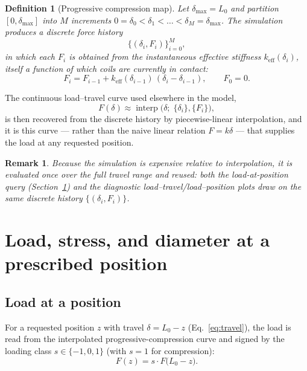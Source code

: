 \documentclass[11pt]{article}
\newtheorem{definition}{Definition}
\newtheorem{remark}{Remark}
\begin{document}
\begin{definition}[Progressive compression map]
Let $\delta_{\max} = L_0$ and partition $[0,\delta_{\max}]$ into $M$
increments $0=\delta_0 <\delta_1<\dots<\delta_M=\delta_{\max}$. The
simulation produces a discrete force history
\begin{equation}
\big\{(\delta_i, F_i)\big\}_{i=0}^{M},
\end{equation}
in which each $F_i$ is obtained from the instantaneous effective
stiffness $k_{\mathrm{eff}}(\delta_i)$, itself a function of which coils
are currently in contact:
\begin{equation}
F_i = F_{i-1} + k_{\mathrm{eff}}(\delta_{i-1})\,(\delta_i - \delta_{i-1}),
\qquad F_0 = 0 .
\label{eq:incremental-force}
\end{equation}
\end{definition}

The continuous load--travel curve used elsewhere in the model,
\begin{equation}
F(\delta) \approx \operatorname{interp}\big(\delta;\;\{\delta_i\},\{F_i\}\big),
\label{eq:interp}
\end{equation}
is then recovered from the discrete history by piecewise-linear
interpolation, and it is this curve — rather than the naive linear
relation $F = k\delta$ — that supplies the load at any requested
position.

\begin{remark}
Because the simulation is expensive relative to interpolation, it is
evaluated once over the full travel range and reused: both the
load-at-position query (Section~\ref{sec:load-position}) and the
diagnostic load--travel/load--position plots draw on the same discrete
history $\{(\delta_i,F_i)\}$.
\end{remark}

\section{Load, stress, and diameter at a prescribed position}
\label{sec:load-position}

\subsection{Load at a position}

For a requested position $z$ with travel $\delta = L_0 - z$
(Eq.~\eqref{eq:travel}), the load is read from the interpolated
progressive-compression curve and signed by the loading class
$s\in\{-1,0,1\}$ (with $s=1$ for compression):
\begin{equation}
F(z) = s\cdot F\big(L_0 - z\big).
\label{eq:load-at-position}
\end{equation}
\end{document}
